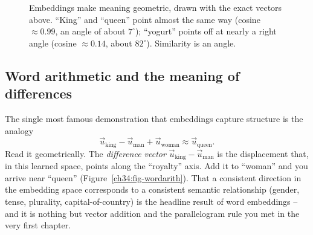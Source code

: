 \begin{figure}[H]
\centering
{}
\caption{Embeddings make meaning geometric, drawn with the exact vectors above. ``King''
and ``queen'' point almost the same way (cosine $\approx 0.99$, an angle of about
$7^\circ$); ``yogurt'' points off at nearly a right angle (cosine $\approx 0.14$, about
$82^\circ$). Similarity is an angle.}
\label{ch34:fig-cosine}
\end{figure}

\subsection{Word arithmetic and the meaning of differences}

The single most famous demonstration that embeddings capture structure is the analogy
\[
\vec{u}_{\text{king}} - \vec{u}_{\text{man}} + \vec{u}_{\text{woman}} \approx
\vec{u}_{\text{queen}}.
\]
Read it geometrically. The \emph{difference vector} $\vec{u}_{\text{king}} -
\vec{u}_{\text{man}}$ is the displacement that, in this learned space, points along the
``royalty'' axis. Add it to ``woman'' and you arrive near ``queen'' (Figure~\ref{ch34:fig-wordarith}).
That a consistent
direction in the embedding space corresponds to a consistent semantic relationship
(gender, tense, plurality, capital-of-country) is the headline result of word
embeddings -- and it is nothing but vector addition and the parallelogram rule you met in
the very first chapter.

